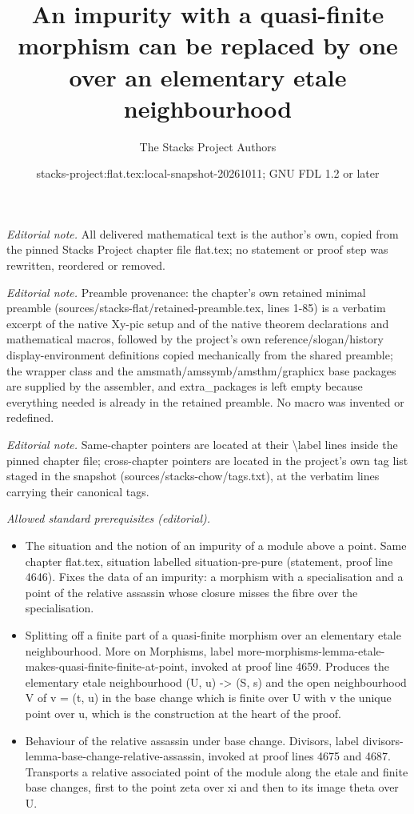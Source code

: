 \documentclass[10pt,a4paper]{amsart}
\title{An impurity with a quasi-finite morphism can be replaced by one over an elementary etale neighbourhood}
\author{The Stacks Project Authors}
\date{stacks-project:flat.tex:local-snapshot-20261011; GNU FDL 1.2 or later}
\theoremstyle{plain}
\theoremstyle{definition}
\theoremstyle{remark}
\numberwithin{equation}{subsection}
\begin{document}
\maketitle
\noindent\textit{Editorial note.} All delivered mathematical text is the author's own, copied from the pinned Stacks Project chapter file flat.tex; no statement or proof step was rewritten, reordered or removed.\par\medskip
\noindent\textit{Editorial note.} Preamble provenance: the chapter's own retained minimal preamble (sources/stacks-flat/retained-preamble.tex, lines 1-85) is a verbatim excerpt of the native Xy-pic setup and of the native theorem declarations and mathematical macros, followed by the project's own reference/slogan/history display-environment definitions copied mechanically from the shared preamble; the wrapper class and the amsmath/amssymb/amsthm/graphicx base packages are supplied by the assembler, and extra\_packages is left empty because everything needed is already in the retained preamble. No macro was invented or redefined.\par\medskip
\noindent\textit{Editorial note.} Same-chapter pointers are located at their \textbackslash{}label lines inside the pinned chapter file; cross-chapter pointers are located in the project's own tag list staged in the snapshot (sources/stacks-chow/tags.txt), at the verbatim lines carrying their canonical tags.\par\medskip
\noindent\textit{Allowed standard prerequisites (editorial).}\begin{itemize}
\item The situation and the notion of an impurity of a module above a point. Same chapter flat.tex, situation labelled situation-pre-pure (statement, proof line 4646). Fixes the data of an impurity: a morphism with a specialisation and a point of the relative assassin whose closure misses the fibre over the specialisation.
\item Splitting off a finite part of a quasi-finite morphism over an elementary etale neighbourhood. More on Morphisms, label more-morphisms-lemma-etale-makes-quasi-finite-finite-at-point, invoked at proof line 4659. Produces the elementary etale neighbourhood (U, u) -> (S, s) and the open neighbourhood V of v = (t, u) in the base change which is finite over U with v the unique point over u, which is the construction at the heart of the proof.
\item Behaviour of the relative assassin under base change. Divisors, label divisors-lemma-base-change-relative-assassin, invoked at proof lines 4675 and 4687. Transports a relative associated point of the module along the etale and finite base changes, first to the point zeta over xi and then to its image theta over U.
\end{itemize}\medskip
\end{document}
